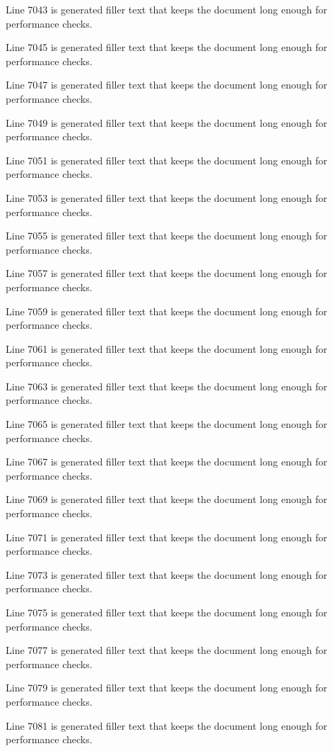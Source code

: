 Line 7043 is generated filler text that keeps the document long enough for performance checks.

Line 7045 is generated filler text that keeps the document long enough for performance checks.

Line 7047 is generated filler text that keeps the document long enough for performance checks.

Line 7049 is generated filler text that keeps the document long enough for performance checks.

Line 7051 is generated filler text that keeps the document long enough for performance checks.

Line 7053 is generated filler text that keeps the document long enough for performance checks.

Line 7055 is generated filler text that keeps the document long enough for performance checks.

Line 7057 is generated filler text that keeps the document long enough for performance checks.

Line 7059 is generated filler text that keeps the document long enough for performance checks.

Line 7061 is generated filler text that keeps the document long enough for performance checks.

Line 7063 is generated filler text that keeps the document long enough for performance checks.

Line 7065 is generated filler text that keeps the document long enough for performance checks.

Line 7067 is generated filler text that keeps the document long enough for performance checks.

Line 7069 is generated filler text that keeps the document long enough for performance checks.

Line 7071 is generated filler text that keeps the document long enough for performance checks.

Line 7073 is generated filler text that keeps the document long enough for performance checks.

Line 7075 is generated filler text that keeps the document long enough for performance checks.

Line 7077 is generated filler text that keeps the document long enough for performance checks.

Line 7079 is generated filler text that keeps the document long enough for performance checks.

Line 7081 is generated filler text that keeps the document long enough for performance checks.

